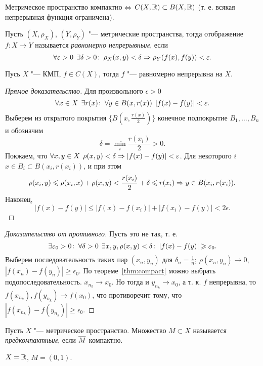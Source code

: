 \documentclass[main]{subfiles}
\begin{document}
\begin{exercise}
  Метрическое пространство компактно \( \Leftrightarrow \)
  \( C(X, \mathbb{R}) \subset B(X, \mathbb{R}) \)
  (т. е. всякая непрерывная функция ограничена).
\end{exercise}

\begin{definition}
  Пусть \( (X, \rho_X) \), \( (Y, \rho_Y) \) "---
  метрические пространства, тогда
  отображение \( f : X \to Y \) называется
  \emph{равномерно непрерывным}, если
  \[
    \forall {\varepsilon> 0} \; \,
    \exists \delta > 0 \colon \:
    \rho_X(x, y) < \delta \Rightarrow
    \rho_Y(f(x), f(y)) < \varepsilon.
  \]
\end{definition}

\begin{theorem*}[Кантора]
  Пусь \( X \) "--- КМП, \( f \in C(X) \),
  тогда \( f \) "--- равномерно непрерывна на \( X \).
\end{theorem*}
\begin{proof}[Прямое доказательство]
  Для произвольного \( \epsilon > 0 \)
  \[
    \forall {x \in X} \; \, \exists r(x) \colon \:
    \forall {y \in B(x, r(x))} \; \,
    |f(x) - f(y)| < \varepsilon.
  \]
  Выберем из открытого покрытия
  \( \{ B(x, \frac{r(x)}{2}) \} \) конечное
  подпокрытие \( B_1, \dots, B_n \)
  и обозначим \[ \delta = \min_i \frac{r(x_i)}{2} > 0. \]
  Покжаем, что \( \forall {x, y \in X} \; \, \rho(x, y) < \delta
  \Rightarrow |f(x) - f(y)| < \varepsilon \).
  Для некоторого \( i \) \( x \in B_i \subset B(x_i, r(x_i)) \),
  и при этом
  \[
    \rho(x_i, y) \leqslant
    \rho(x_i, x) + \rho(x, y) <
    \frac{r(x_i)}{2} + \delta \leqslant
    r(x_i) \Rightarrow y \in B(x_i, r(x_i)).
  \]
  Наконец,
  \[
    |f(x) - f(y)| \le
    |f(x) - f(x_i)| + |f(x_i) - f(y)| <
    2 \epsilon.
  \]
\end{proof}
\begin{proof}[Доказательство от противного]
  Пусть это не так, т. е.
  \[
    \exists \varepsilon_0 > 0 \colon \:
    \forall {\delta > 0} \; \,
    \exists x, y, \rho(x, y) < \delta \colon \:
    |f(x) - f(y)| \geqslant \varepsilon_0.
  \]
  Выберем последовательность таких пар \( (x_n, y_n) \)
  для \( \delta_n = \frac{1}{n} \); \( \rho(x_n, y_n) \to 0 \),
  \( |f(x_n) - f(y_n)| \ge \epsilon_0 \).
  По теореме~\ref{thm:compact} можно выбрать подопоследовательность.
  \( x_{n_k} \to x_0 \). Но тогда и \( y_{n_k} \to x_0 \),
  а т. к. \( f \) непрерывна, то \( f(x_{n_k}), f(y_{n_k}) \to f(x_0) \),
  что противоречит тому, что
  \( |f(x_{n_k}) - f(y_{n_k})| \ge \epsilon_0 \).
\end{proof}

\begin{definition}
  Пусть \( X \) "--- метрическое пространство. Множество \( M \subset X \)
  называется \emph{предкомпактным}, если \( \overline{M} \) компактно.
\end{definition}
\begin{example}
  \( X = \mathbb{R} \), \( M = (0, 1) \).
\end{example}
\end{document}
